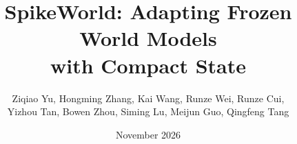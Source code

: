 \documentclass[11pt]{article}
\title{\bfseries SpikeWorld: Adapting Frozen World Models\\with Compact State}
\author{\normalsize Ziqiao Yu, Hongming Zhang, Kai Wang, Runze Wei, Runze Cui,\\
\normalsize Yizhou Tan, Bowen Zhou, Siming Lu, Meijun Guo, Qingfeng Tang}
\date{November 2026}
\begin{document}
\raggedbottom
\maketitle
\begin{abstract}

\end{abstract}







\begingroup
\small\setlength{\bibsep}{0pt}


\endgroup
\clearpage
\appendix




\end{document}
